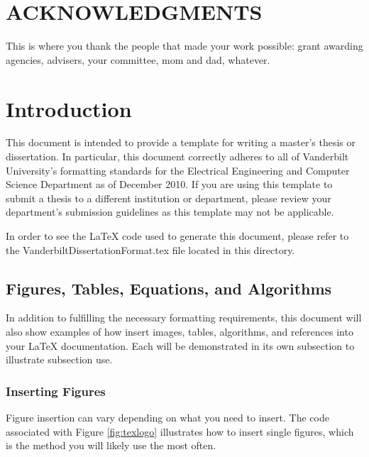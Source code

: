 \documentclass[10pt]{report}  %
\begin{document}
\chapter*{ACKNOWLEDGMENTS}
\vspace{7mm}

This is where you thank the people that made your work possible: grant awarding agencies, advisers, your committee, mom and dad, whatever.


\singlespacing
\tableofcontents

\begingroup
\setlength{\parskip}{1\baselineskip}
\listoftables
\newpage
\listoffigures
\newpage
\printnomenclature
\newpage
\endgroup

\normalsize
\doublespacing
{}
\setcounter{page}{1}
\chapter{Introduction}
	This document is intended to provide a template for writing a master's thesis or dissertation. In particular, this document correctly adheres to all of Vanderbilt University's formatting standards for the Electrical Engineering and Computer Science Department as of December 2010. If you are using this template to submit a thesis to a different institution or department, please review your department's submission guidelines as this template may not be applicable.
	
	In order to see the LaTeX code used to generate this document, please refer to the VanderbiltDissertationFormat.tex file located in this directory. 
	
\section{Figures, Tables, Equations, and Algorithms}
	In addition to fulfilling the necessary formatting requirements, this document will also show examples of how insert images, tables, algorithms, and references into your LaTeX documentation. Each will be demonstrated in its own subsection to illustrate subsection use.

\subsection{Inserting Figures}
Figure insertion can vary depending on what you need to insert. The code associated with Figure \ref{fig:texlogo} illustrates how to insert single figures, which is the method you will likely use the most often. 
\end{document}
